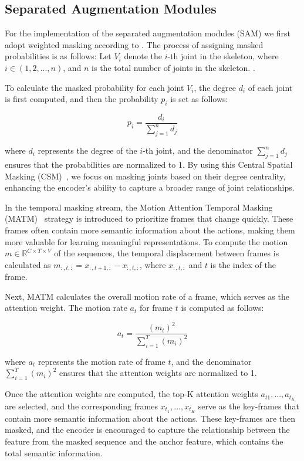 \subsection{Separated Augmentation Modules}

For the implementation of the separated augmentation modules (SAM) we first adopt weighted masking according to \textcite{zhou2023self}. The process of assigning masked probabilities is as follows: Let \(V_i\) denote the \(i\)-th joint in the skeleton, where \(i \in (1, 2, ..., n)\), and \(n\) is the total number of joints in the skeleton. .

To calculate the masked probability for each joint \(V_i\), the degree \(d_i\) of each joint is first computed, and then the probability \(p_i\) is set as follows:

\[ p_i = \frac{d_i}{\sum_{j=1}^n d_j} \]

where \(d_i\) represents the degree of the \(i\)-th joint, and the denominator \(\sum_{j=1}^n d_j\) ensures that the probabilities are normalized to 1. By using this Central Spatial Masking (CSM)~\cite{zhou2023self}, we focus on masking joints based on their degree centrality, enhancing the encoder's ability to capture a broader range of joint relationships.

In the temporal masking stream, the Motion Attention Temporal Masking (MATM)~\cite{zhou2023self} strategy is introduced to prioritize frames that change quickly. These frames often contain more semantic information about the actions, making them more valuable for learning meaningful representations. To compute the motion \(m \in \mathbb{R}^{C \times T \times V}\) of the sequences, the temporal displacement between frames is calculated as \(m_{:,t,:} = x_{:,t+1,:} - x_{:,t,:}\), where \(x_{:,t,:}\) and \(t\) is the index of the frame.

Next, MATM calculates the overall motion rate of a frame, which serves as the attention weight. The motion rate \(a_t\) for frame \(t\) is computed as follows:

\[ a_t = \frac{(m_t)^2}{\sum_{i=1}^T (m_i)^2} \]

where \(a_t\) represents the motion rate of frame \(t\), and the denominator \(\sum_{i=1}^T (m_i)^2\) ensures that the attention weights are normalized to 1.

Once the attention weights are computed, the top-K attention weights \(a_{t1}, ..., a_{t_K}\) are selected, and the corresponding frames \(x_{t_1}, ..., x_{t_K}\) serve as the key-frames that contain more semantic information about the actions. These key-frames are then masked, and the encoder is encouraged to capture the relationship between the feature from the masked sequence and the anchor feature, which contains the total semantic information.


